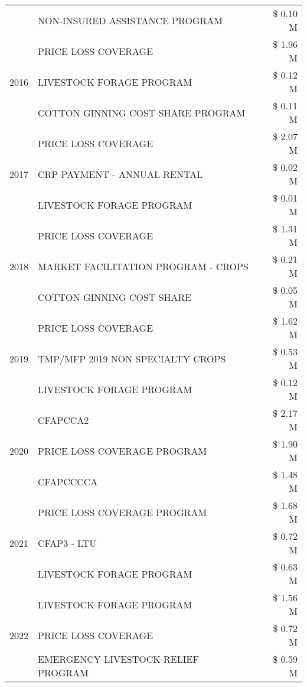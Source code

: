\begin{tabular}{llr}
 & NON-INSURED ASSISTANCE PROGRAM & \$ 0.10 M \\
\cline{1-3}
\multirow[t]{3}{*}{2016} & PRICE LOSS COVERAGE & \$ 1.96 M \\
 & LIVESTOCK FORAGE PROGRAM & \$ 0.12 M \\
 & COTTON GINNING COST SHARE PROGRAM & \$ 0.11 M \\
\cline{1-3}
\multirow[t]{3}{*}{2017} & PRICE LOSS COVERAGE & \$ 2.07 M \\
 & CRP PAYMENT - ANNUAL RENTAL & \$ 0.02 M \\
 & LIVESTOCK FORAGE PROGRAM & \$ 0.01 M \\
\cline{1-3}
\multirow[t]{3}{*}{2018} & PRICE LOSS COVERAGE & \$ 1.31 M \\
 & MARKET FACILITATION PROGRAM - CROPS & \$ 0.21 M \\
 & COTTON GINNING COST SHARE & \$ 0.05 M \\
\cline{1-3}
\multirow[t]{3}{*}{2019} & PRICE LOSS COVERAGE & \$ 1.62 M \\
 & TMP/MFP 2019 NON SPECIALTY CROPS & \$ 0.53 M \\
 & LIVESTOCK FORAGE PROGRAM & \$ 0.12 M \\
\cline{1-3}
\multirow[t]{3}{*}{2020} & CFAPCCA2 & \$ 2.17 M \\
 & PRICE LOSS COVERAGE PROGRAM & \$ 1.90 M \\
 & CFAPCCCCA & \$ 1.48 M \\
\cline{1-3}
\multirow[t]{3}{*}{2021} & PRICE LOSS COVERAGE PROGRAM & \$ 1.68 M \\
 & CFAP3 - LTU & \$ 0.72 M \\
 & LIVESTOCK FORAGE PROGRAM & \$ 0.63 M \\
\cline{1-3}
\multirow[t]{3}{*}{2022} & LIVESTOCK FORAGE PROGRAM & \$ 1.56 M \\
 & PRICE LOSS COVERAGE & \$ 0.72 M \\
 & EMERGENCY LIVESTOCK RELIEF PROGRAM & \$ 0.59 M \\
\cline{1-3}
\bottomrule
\end{tabular}
